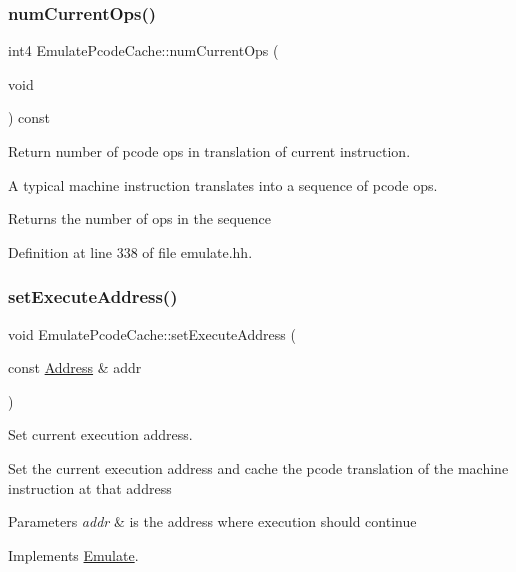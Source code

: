 \subsubsection{\texorpdfstring{numCurrentOps()}{numCurrentOps()}}
{\footnotesize\ttfamily int4 Emulate\+Pcode\+Cache\+::num\+Current\+Ops (\begin{DoxyParamCaption}\item[{void}]{ }\end{DoxyParamCaption}) const\hspace{0.3cm}{\ttfamily [inline]}}



Return number of pcode ops in translation of current instruction. 

A typical machine instruction translates into a sequence of pcode ops. \begin{DoxyReturn}{Returns}
the number of ops in the sequence 
\end{DoxyReturn}


Definition at line 338 of file emulate.\+hh.

\mbox{\label{class_emulate_pcode_cache_a732fcebcb6aae1a9e7b9e833df6f1e85}} 
\subsubsection{\texorpdfstring{setExecuteAddress()}{setExecuteAddress()}}
{\footnotesize\ttfamily void Emulate\+Pcode\+Cache\+::set\+Execute\+Address (\begin{DoxyParamCaption}\item[{const \mbox{\hyperlink{class_address}{Address}} \&}]{addr }\end{DoxyParamCaption})\hspace{0.3cm}{\ttfamily [virtual]}}



Set current execution address. 

Set the current execution address and cache the pcode translation of the machine instruction at that address 
\begin{DoxyParams}{Parameters}
{\em addr} & is the address where execution should continue \\
\hline
\end{DoxyParams}


Implements \mbox{\hyperlink{class_emulate_aff5f9779fdad54f853d4e799f5289410}{Emulate}}.



